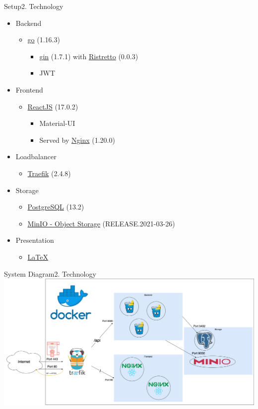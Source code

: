 \documentclass[aspectratio=169,20pt]{beamer}
\begin{document}
\begin{frame}{Setup}{2. Technology}
	\begin{itemize}
		\item{Backend}
		\begin{itemize}
			\item{\href{https://golang.org/}{go} (1.16.3)}
			\begin{itemize}
				\item{\href{https://gin-gonic.com/}{gin} (1.7.1) with \href{https://github.com/dgraph-io/ristretto}{Ristretto} (0.0.3)}
				\item{JWT}
			\end{itemize}
		\end{itemize}
		\item{Frontend}
		\begin{itemize}
			\item{\href{https://reactjs.org/versions/}{ReactJS} (17.0.2)}
			\begin{itemize}
				\item{Material-UI}
				\item{Served by \href{https://nginx.org/}{Nginx} (1.20.0)}
			\end{itemize}
		\end{itemize}
		\item{Loadbalancer}
		\begin{itemize}
			\item{\href{https://traefik.io/}{Traefik} (2.4.8)}
		\end{itemize} 
		\item{Storage}
		\begin{itemize}
			\item{\href{https://www.postgresql.org/}{PostgreSQL} (13.2)}
			\item{\href{https://min.io/}{MinIO - Object Storage} (RELEASE.2021-03-26)}
		\end{itemize}
		\item{Presentation}
		\begin{itemize}
			\item{\href{https://github.com/ost-fh/Latex-Beamer-Theme}{LaTeX}}
		\end{itemize}       
	\end{itemize}
\end{frame}

\begin{frame}{System Diagram}{2. Technology}
	\includegraphics[scale=0.45]{Infrastruktur}	
\end{frame}
\end{document}
